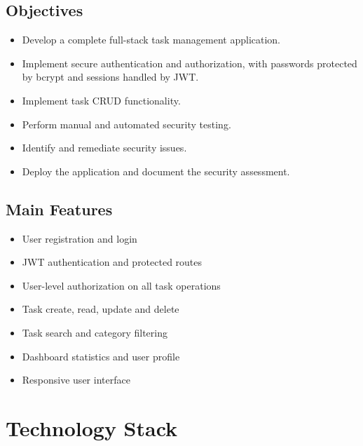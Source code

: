 \documentclass[11pt,a4paper]{article}
\begin{document}
\subsection{Objectives}
\begin{itemize}[leftmargin=*]
\item Develop a complete full-stack task management application.
\item Implement secure authentication and authorization, with passwords protected by bcrypt and sessions handled by JWT.
\item Implement task CRUD functionality.
\item Perform manual and automated security testing.
\item Identify and remediate security issues.
\item Deploy the application and document the security assessment.
\end{itemize}

\subsection{Main Features}
\begin{itemize}[leftmargin=*]
\item User registration and login
\item JWT authentication and protected routes
\item User-level authorization on all task operations
\item Task create, read, update and delete
\item Task search and category filtering
\item Dashboard statistics and user profile
\item Responsive user interface
\end{itemize}

\section{Technology Stack}
\end{document}
